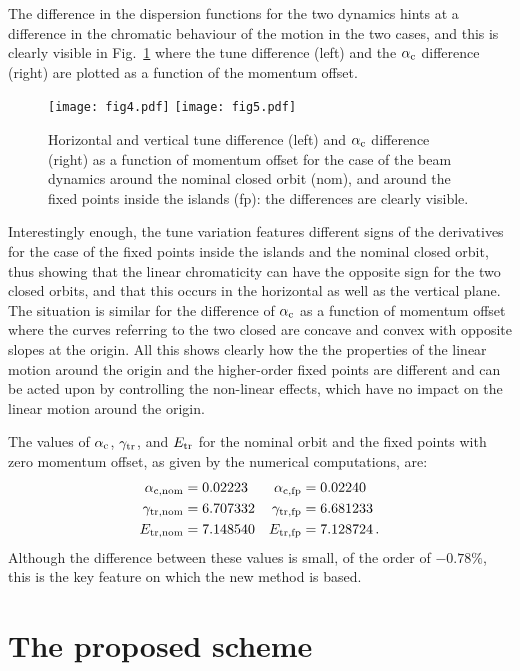 \documentclass{article}
\begin{document}
The difference in the dispersion functions for the two dynamics hints at a difference in the chromatic behaviour of the motion in the two cases, and this is clearly visible in Fig.~\ref{chroma_acomp} where the tune difference (left) and the $\alpha_{\rm c}$ difference (right) are plotted as a function of the momentum offset. 
%
\begin{figure}[htb]
\centering
  \texttt{[image: fig4.pdf]}
  \texttt{[image: fig5.pdf]}
  \caption{\label{chroma_acomp} Horizontal and vertical tune difference (left) and $\alpha_{\rm c}$ difference (right) as a function of momentum offset for the case of the beam dynamics around the nominal closed orbit (nom), and around the fixed points inside the islands (fp): the differences are clearly visible.}
\end{figure}
%

Interestingly enough, the tune variation features different signs of the derivatives for the case of the fixed points inside the islands and the nominal closed orbit, thus showing that the linear chromaticity can have the opposite sign for the two closed orbits, and that this occurs in the horizontal as well as the vertical plane. The situation is similar for the difference of $\alpha_{\rm c}$ as a function of momentum offset where the curves referring to the two closed are concave and convex with opposite slopes at the origin. All this shows clearly how the the properties of the linear motion around the origin and the higher-order fixed points are different and can be acted upon by controlling the non-linear effects, which have no impact on the linear motion around the origin. 

The values of $\alpha_{\rm c}$, $\gamma_{\rm tr}$, and $E_{\rm tr}$ for the nominal orbit and the fixed points with zero momentum offset, as given by the numerical computations, are:
%
\begin{align}
\alpha_{\rm c, nom} & = 0.02223 & \alpha_{\rm c, fp} & = 0.02240 \nonumber \\
\gamma_{\rm tr, nom} & = 6.707332 & \gamma_{\rm tr, fp} & = 6.681233 \\
E_{\rm tr, nom} & = 7.148540 & E_{\rm tr, fp} & = 7.128724 \nonumber \, .
\end{align}
%
Although the difference between these values is small, of the order of $-0.78\%$, this is the key feature on which the new method is based.
%
\section{The proposed scheme}\label{sec:new_scheme}
%
\end{document}
